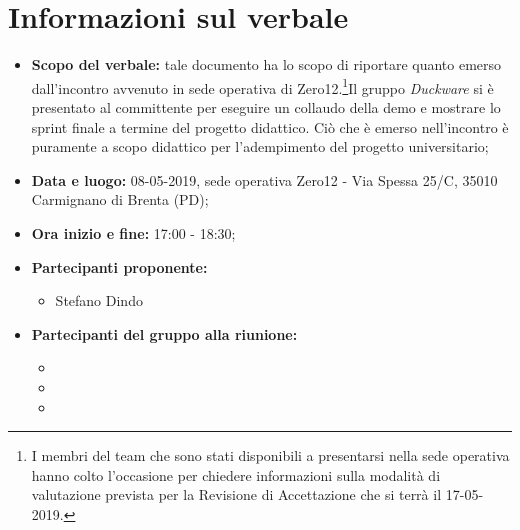 \clearpage
\section{Informazioni sul verbale}
\begin{itemize}
	\item \textbf {Scopo del verbale:} tale documento ha lo scopo di riportare quanto emerso dall'incontro avvenuto in sede operativa di Zero12.\footnote{I membri del team che sono stati disponibili a presentarsi nella sede operativa hanno colto l'occasione per chiedere informazioni sulla modalità di valutazione prevista per la Revisione di Accettazione che si terrà il 17-05-2019.}{Il gruppo \emph{Duckware} si è presentato al committente per eseguire un collaudo della demo e mostrare lo sprint finale a termine del progetto didattico}. Ciò che è emerso nell'incontro è puramente a scopo didattico per l'adempimento del progetto universitario;
	\item \textbf {Data e luogo:} 08-05-2019, sede operativa Zero12 - Via Spessa 25/C, 35010 Carmignano di Brenta (PD);
	\item \textbf {Ora inizio e fine:} 17:00 - 18:30;
	\item \textbf {Partecipanti proponente:} 
		\begin{itemize}
			\item Stefano Dindo
		\end{itemize}
	\item \textbf {Partecipanti del gruppo alla riunione:} 
		 \begin{itemize}
			\item \luca
			\item \matteo
			\item \andrea
		\end{itemize}
\end{itemize}